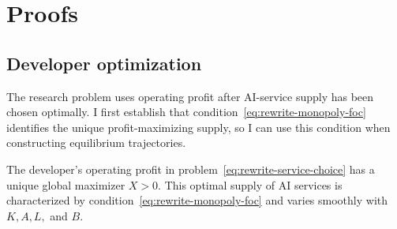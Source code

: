 \section{Proofs}
\label{app:rewrite-proofs}

\subsection{Developer optimization}
\label{app:rewrite-developer-proofs}

The research problem uses operating profit after AI-service supply has
been chosen optimally. I first establish that
condition~\eqref{eq:rewrite-monopoly-foc} identifies the unique
profit-maximizing supply, so I can use this condition when constructing
equilibrium trajectories.

\begin{lemma}
\label{lem:rewrite-monopoly-choice}
The developer's operating profit in
problem~\eqref{eq:rewrite-service-choice} has a unique global maximizer
$X>0$. This optimal supply of AI services is characterized by
condition~\eqref{eq:rewrite-monopoly-foc} and varies smoothly with
$K,A,L,$ and $B$.
\end{lemma}

